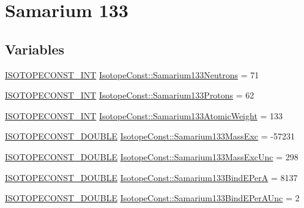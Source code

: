 \hypertarget{group___isotope_const-_samarium-_sm133}{}\section{Samarium 133}
\label{group___isotope_const-_samarium-_sm133}
\subsection*{Variables}
\begin{DoxyCompactItemize}
\item 
\mbox{\hyperlink{group___isotope_const-_macros_ga5f18360b3e99483a35c32d789e62621c}{I\+S\+O\+T\+O\+P\+E\+C\+O\+N\+S\+T\+\_\+\+I\+NT}} \mbox{\hyperlink{group___isotope_const-_samarium-_sm133_ga88648cf13aa4b413e484aaa03f31e62d}{Isotope\+Const\+::\+Samarium133\+Neutrons}} = 71
\item 
\mbox{\hyperlink{group___isotope_const-_macros_ga5f18360b3e99483a35c32d789e62621c}{I\+S\+O\+T\+O\+P\+E\+C\+O\+N\+S\+T\+\_\+\+I\+NT}} \mbox{\hyperlink{group___isotope_const-_samarium-_sm133_ga7deb91e73b5edd96ccbf644992056426}{Isotope\+Const\+::\+Samarium133\+Protons}} = 62
\item 
\mbox{\hyperlink{group___isotope_const-_macros_ga5f18360b3e99483a35c32d789e62621c}{I\+S\+O\+T\+O\+P\+E\+C\+O\+N\+S\+T\+\_\+\+I\+NT}} \mbox{\hyperlink{group___isotope_const-_samarium-_sm133_ga2d8da4b99b3a0e80dea455f4bcf24f9e}{Isotope\+Const\+::\+Samarium133\+Atomic\+Weight}} = 133
\item 
\mbox{\hyperlink{group___isotope_const-_macros_ga8f45a7272ce02c0b4c65c44636ed719a}{I\+S\+O\+T\+O\+P\+E\+C\+O\+N\+S\+T\+\_\+\+D\+O\+U\+B\+LE}} \mbox{\hyperlink{group___isotope_const-_samarium-_sm133_ga449ab14539e1e3324457cb46decfc114}{Isotope\+Const\+::\+Samarium133\+Mass\+Exc}} = -\/57231
\item 
\mbox{\hyperlink{group___isotope_const-_macros_ga8f45a7272ce02c0b4c65c44636ed719a}{I\+S\+O\+T\+O\+P\+E\+C\+O\+N\+S\+T\+\_\+\+D\+O\+U\+B\+LE}} \mbox{\hyperlink{group___isotope_const-_samarium-_sm133_ga0f50ee17c5b23ad13264ea301fe1655d}{Isotope\+Const\+::\+Samarium133\+Mass\+Exc\+Unc}} = 298
\item 
\mbox{\hyperlink{group___isotope_const-_macros_ga8f45a7272ce02c0b4c65c44636ed719a}{I\+S\+O\+T\+O\+P\+E\+C\+O\+N\+S\+T\+\_\+\+D\+O\+U\+B\+LE}} \mbox{\hyperlink{group___isotope_const-_samarium-_sm133_gab0f5adacf757a89ad52de6610861c2ab}{Isotope\+Const\+::\+Samarium133\+Bind\+E\+PerA}} = 8137
\item 
\mbox{\hyperlink{group___isotope_const-_macros_ga8f45a7272ce02c0b4c65c44636ed719a}{I\+S\+O\+T\+O\+P\+E\+C\+O\+N\+S\+T\+\_\+\+D\+O\+U\+B\+LE}} \mbox{\hyperlink{group___isotope_const-_samarium-_sm133_ga48eabfa0f8e3695cfbbc5818c5e6861e}{Isotope\+Const\+::\+Samarium133\+Bind\+E\+Per\+A\+Unc}} = 2

\end{DoxyCompactItemize}
